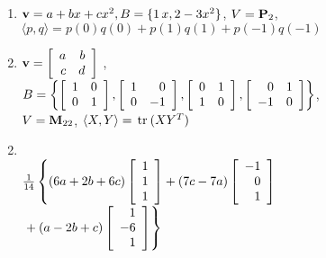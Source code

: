 \begin{multicols}{2}
\begin{ex}
\begin{enumerate}[leftmargin=1em,label={\alph*.}]
\item $ \textbf{v} = a + bx + cx^2, B = \{1\, x, 2- 3x^2\}$, $V = \textbf{P}_2$, \newline $\langle p, q \rangle = p(0)q(0) + p(1)q(1) + p(-1)q(-1) $

\item $\textbf{v} = 
\left[ \begin{array}{rr}
a & b \\
c & d
\end{array} \right]$
, \\ $B = \left\{
\left[ \begin{array}{rr}
	1 & 0 \\
	0 & 1
\end{array} \right]
,
\left[ \begin{array}{rr}
	1 & 0 \\
	0 & -1
\end{array} \right]
,
\left[ \begin{array}{rr}
	0 & 1 \\
	1 & 0
\end{array} \right]
, 
\left[ \begin{array}{rr}
	0 & 1 \\
	-1 & 0
\end{array} \right]
\right\}$, \\ $ V = \textbf{M}_{22}$, $\langle X, Y \rangle = \thinspace\operatorname{tr\medspace}(XY^T)$

\end{enumerate}
\begin{sol}
\begin{enumerate}[label={\alph*.}]
\setcounter{enumi}{1}
\item \hspace{1em} \\
\hspace*{-2em}$ \tfrac{1}{14} \left\{(6a + 2b + 6c)
\left[ \begin{array}{r}
1 \\
1 \\
1
\end{array} \right]
+ (7c - 7a)
\left[ \begin{array}{r}
-1 \\
0 \\
1
\end{array} \right] \right.$ \\
\hspace*{-2em}$\left. {} + (a -2b + c)
\left[ \begin{array}{r}
1 \\
-6 \\
1
\end{array} \right]
\right\}$


\end{enumerate}
\end{sol}
\end{ex}
\end{multicols}
